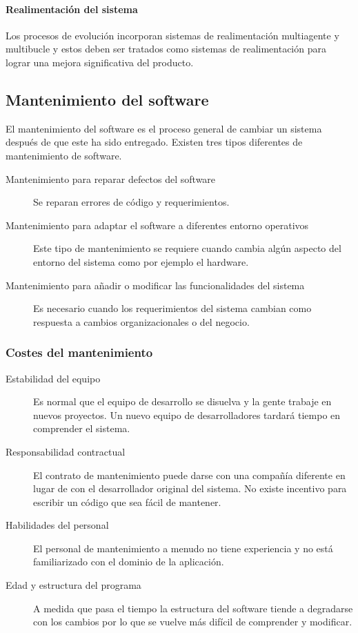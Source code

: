 {\paragraph{Realimentación del sistema}
Los procesos de evolución incorporan sistemas de realimentación multiagente y multibucle y estos deben ser tratados como sistemas de realimentación para lograr una mejora significativa del producto.
\subsection{Mantenimiento del software}
El mantenimiento del software es el proceso general de cambiar un sistema después de que este ha sido entregado. Existen tres tipos diferentes de mantenimiento de software.
\begin{description}
\item[Mantenimiento para reparar defectos del software] Se reparan errores de código y requerimientos.
\item[Mantenimiento para adaptar el software a diferentes entorno operativos] Este tipo de mantenimiento se requiere cuando cambia algún aspecto del entorno del sistema como por ejemplo el hardware.
\item[Mantenimiento para añadir o modificar las funcionalidades del sistema] Es necesario cuando los requerimientos del sistema cambian como respuesta a cambios organizacionales o del negocio.
\end{description}
\subsubsection{Costes del mantenimiento}
\begin{description}
\item[Estabilidad del equipo] Es normal que el equipo de desarrollo se disuelva y la gente trabaje en nuevos proyectos. Un nuevo equipo de desarrolladores tardará tiempo en comprender el sistema.
\item[Responsabilidad contractual] El contrato de mantenimiento puede darse con una compañía diferente en lugar de con el desarrollador original del sistema. No existe incentivo para escribir un código que sea fácil de mantener.
\item[Habilidades del personal] El personal de mantenimiento a menudo no tiene experiencia y no está familiarizado con el dominio de la aplicación.
\item[Edad y estructura del programa] A medida que pasa el tiempo la estructura del software tiende a degradarse con los cambios por lo que se vuelve más difícil de comprender y modificar.
\end{description}
}
